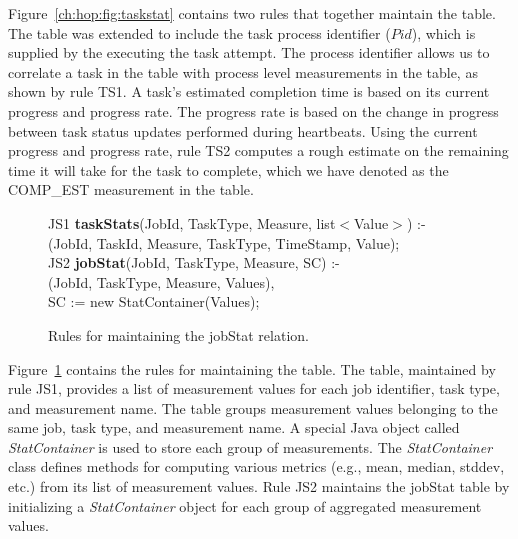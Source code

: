 Figure~\ref{ch:hop:fig:taskstat} contains two rules that together maintain the  table. 
The  table was extended to include the task process identifier ($Pid$), which is supplied
by the \TT executing the task attempt. The process identifier allows us to correlate a task in the  
table with process level measurements in the  table, as shown by rule TS1. 
A task's estimated completion time is based on its current progress and progress rate. The progress rate
is based on the change in progress between task status updates performed during \TT heartbeats. 
Using the current progress and progress rate, rule TS2 computes a rough estimate on the remaining time
it will take for the task to complete, which we have denoted as the COMP\_EST measurement in the 
 table. 

\begin{figure}
\ssp
\centering
\begin{boxedminipage}{\linewidth}
JS1 {\bf taskStats}(JobId, TaskType, Measure, list$<$Value$>$) :- \\
(JobId, TaskId, Measure, TaskType, TimeStamp, Value); \\

        
JS2 {\bf jobStat}(JobId, TaskType, Measure, SC) :- \\
(JobId, TaskType, Measure, Values), \\
\datalogspace SC := new StatContainer(Values); \\ 
        
\end{boxedminipage}
\caption{\label{ch:hop:fig:jobstat} Rules for maintaining the jobStat relation.}
\end{figure}

Figure~\ref{ch:hop:fig:jobstat} contains the rules for maintaining the  table. 
The  table, maintained by rule JS1, provides a list of measurement values 
for each job identifier, task type, and measurement name. The  table groups
measurement values belonging to the same job, task type, and measurement name. 
A special Java object called {\em StatContainer} is used to store each group of measurements. 
The {\em StatContainer} class defines methods for computing various metrics (e.g., mean, median, stddev, etc.)
from its list of measurement values. Rule JS2 maintains the jobStat table by initializing a {\em StatContainer} object 
for each group of aggregated measurement values.


